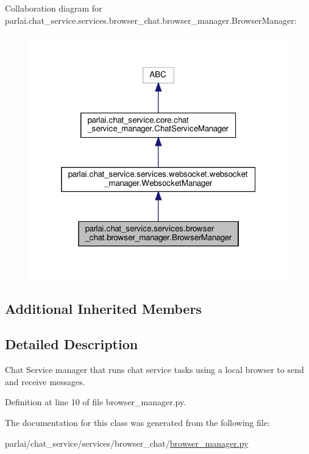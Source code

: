 Collaboration diagram for parlai.\+chat\+\_\+service.\+services.\+browser\+\_\+chat.\+browser\+\_\+manager.\+Browser\+Manager\+:
\nopagebreak
\begin{figure}[H]
\begin{center}
\leavevmode
\includegraphics[width=319pt]{d8/d8c/classparlai_1_1chat__service_1_1services_1_1browser__chat_1_1browser__manager_1_1BrowserManager__coll__graph}
\end{center}
\end{figure}
\subsection*{Additional Inherited Members}


\subsection{Detailed Description}
\begin{DoxyVerb}Chat Service manager that runs chat service tasks using a local browser to send and
receive messages.
\end{DoxyVerb}
 

Definition at line 10 of file browser\+\_\+manager.\+py.



The documentation for this class was generated from the following file\+:\begin{DoxyCompactItemize}
\item 
parlai/chat\+\_\+service/services/browser\+\_\+chat/\hyperlink{browser__manager_8py}{browser\+\_\+manager.\+py}\end{DoxyCompactItemize}
